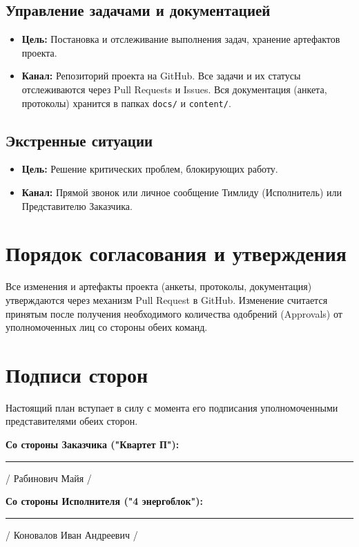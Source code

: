 \documentclass[12pt,a4paper]{article}
\begin{document}
\subsection{Управление задачами и документацией}
\begin{itemize}
    \item \textbf{Цель:} Постановка и отслеживание выполнения задач, хранение артефактов проекта.
    \item \textbf{Канал:} Репозиторий проекта на GitHub. Все задачи и их статусы отслеживаются через Pull Requests и Issues. Вся документация (анкета, протоколы) хранится в папках \texttt{docs/} и \texttt{content/}.
\end{itemize}

\subsection{Экстренные ситуации}
\begin{itemize}
    \item \textbf{Цель:} Решение критических проблем, блокирующих работу.
    \item \textbf{Канал:} Прямой звонок или личное сообщение Тимлиду (Исполнитель) или Представителю Заказчика.
\end{itemize}

\section{Порядок согласования и утверждения}

Все изменения и артефакты проекта (анкеты, протоколы, документация) утверждаются через механизм Pull Request в GitHub. Изменение считается принятым после получения необходимого количества одобрений (Approvals) от уполномоченных лиц со стороны обеих команд.

\section{Подписи сторон}

Настоящий план вступает в силу с момента его подписания уполномоченными представителями обеих сторон.

\textbf{Со стороны Заказчика ("Квартет П"):}

\vspace{2cm}

\rule{5cm}{0.4pt} / Рабинович Майя /

\vspace{1cm}

\textbf{Со стороны Исполнителя ("4 энергоблок"):}

\vspace{2cm}

\rule{5cm}{0.4pt} / Коновалов Иван Андреевич /
\end{document}
